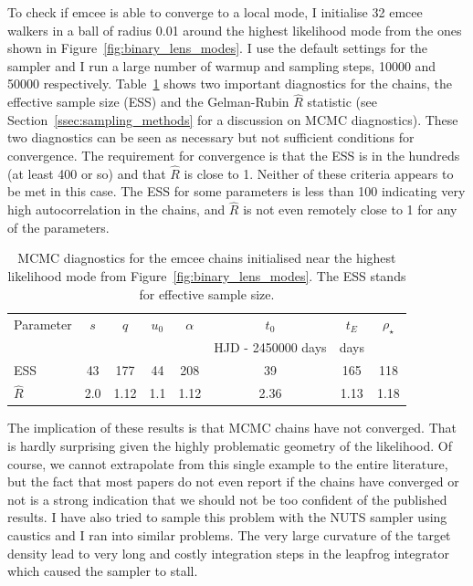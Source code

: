 \documentclass[12pt,dvipsnames]{report}
\newcommand{\ssf}[1]{\textsf{#1}}
\begin{document}
To check if \ssf{emcee} is able to converge to a local mode, I initialise 32 \ssf{emcee} walkers 
in a ball of radius 0.01 around the highest likelihood mode from the ones shown in 
Figure~\ref{fig:binary_lens_modes}. I use the default settings for the sampler and I run
a large number of warmup and sampling steps, 10000 and 50000 respectively. 
Table~\ref{tab:emcee_diagnostics} shows two important diagnostics for the chains, the effective 
sample size (ESS) and the Gelman-Rubin $\hat R$ statistic 
(see Section~\ref{ssec:sampling_methods} for a discussion on MCMC diagnostics). These two 
diagnostics can be seen as necessary but not sufficient conditions for convergence.
The requirement for convergence is that the ESS is in the hundreds (at least 400 or so) 
and that $\hat R$ is close to 1. Neither of these criteria appears to be met in this case. 
The ESS for some  parameters is less than 100 indicating very high autocorrelation in 
the chains, and $\hat R$ is not even remotely close to 1 for any of the parameters.  

\begin{table}[h!]
\centering
\begin{tabular}{lccccccc}
 \toprule
Parameter & $s$ & $q$ & $u_0$& $\alpha$& $t_0$& $t_E$& $\rho_\star$\\
&&&&&HJD - 2450000 days& days&\\
 \midrule
ESS & 43 & 177 & 44 & 208 & 39 & 165 & 118\\
$\hat R$ & 2.0 & 1.12 & 1.1 & 1.12 & 2.36 & 1.13 & 1.18\\
 \bottomrule
\end{tabular}
\caption{MCMC diagnostics for the \ssf{emcee} chains initialised near the highest likelihood
mode from Figure~\ref{fig:binary_lens_modes}. The ESS stands for effective sample size.}
\label{tab:emcee_diagnostics}
\end{table}

The implication of these results is that MCMC chains have not converged. That is hardly 
surprising given the highly problematic geometry of the likelihood. 
Of course, we cannot extrapolate from this single example to the entire literature, but 
the fact that most papers do not even report if the chains have converged or not
is a strong indication that we should not be too confident of the published results. 
I have also tried to sample this problem with the NUTS sampler using \ssf{caustics} 
and I ran into similar problems. The very large curvature of the target density lead to very 
long and costly integration steps in the leapfrog integrator which caused the sampler 
to stall. 
\end{document}
